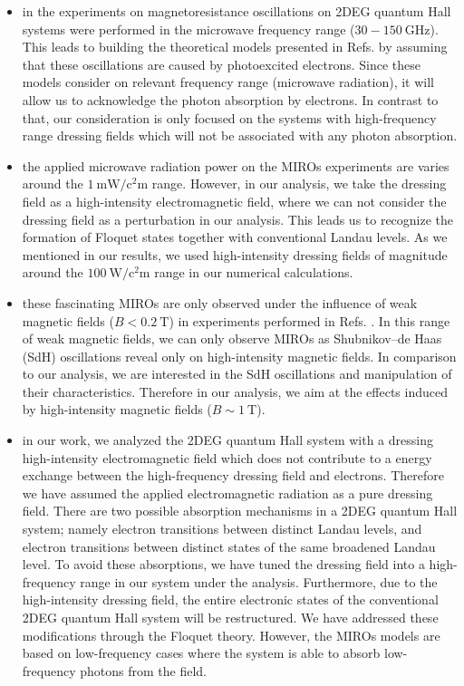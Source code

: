 \documentclass{article}
\begin{document}
\begin{itemize}
  \item
  in the experiments on magnetoresistance oscillations on 2DEG quantum Hall systems \cite{zudov01,mani02,zudov03,mani04} were performed in the microwave frequency range ($30 -\SI{150}{\giga\hertz}$). This leads to building the theoretical models presented in Refs. \cite{durst03,dmitriev03} by assuming that these oscillations are caused by photoexcited electrons. Since these models consider on relevant frequency range (microwave radiation), it will allow us to acknowledge the photon absorption by electrons. In contrast to that, our consideration is only focused on the systems with high-frequency range dressing fields which will not be associated with any photon absorption.
  \item
  the applied microwave radiation power on the MIROs experiments \cite{mani02,zudov03} are varies around the  $\SI{1}{\milli\watt\per\square\centi\metre}$ range. However, in our analysis, we take the dressing field as a high-intensity electromagnetic field, where we can not consider the dressing field as a perturbation in our analysis. This leads us to recognize the formation of Floquet states together with conventional Landau levels. As we mentioned in our results, we used high-intensity dressing fields of magnitude around the $\SI{100}{\watt\per\square\centi\metre}$ range in our numerical calculations.
  \item
  these fascinating MIROs are only observed under the influence of weak magnetic fields ($B < \SI{0.2}{\tesla}$) in experiments performed in Refs. \cite{zudov01,mani02,zudov03,mani04}. In this range of weak magnetic fields,  we can only observe MIROs as Shubnikov–de Haas (SdH) oscillations reveal only on high-intensity magnetic fields. In comparison to our analysis, we are  interested in the SdH oscillations and manipulation of their characteristics. Therefore in our analysis, we aim at the effects induced by high-intensity magnetic fields ($B \sim \SI{1}{\tesla}$).
  \item
  in our work, we analyzed the 2DEG quantum Hall system with a dressing high-intensity electromagnetic field which does not contribute to a energy exchange between the high-frequency dressing field and electrons. Therefore we have assumed the applied electromagnetic radiation as a pure dressing field. There are two possible absorption mechanisms in a 2DEG quantum Hall system; namely electron transitions between distinct Landau levels, and electron transitions between distinct states of the same broadened Landau level. To avoid these absorptions, we have tuned the dressing field into a high-frequency range in our system under the analysis. Furthermore, due to the high-intensity dressing field, the entire electronic states of the conventional 2DEG quantum Hall system will be restructured. We have addressed these modifications through the Floquet theory. However, the MIROs models \cite{durst03,dmitriev03} are based on low-frequency cases where the system is able to absorb low-frequency photons from the field.
\end{itemize}
\end{document}
